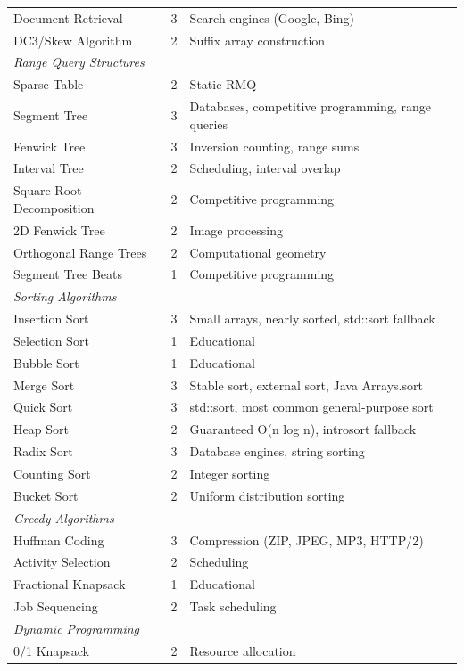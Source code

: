 \begin{center}
\begin{tabular}{lcl}
Document Retrieval & 3 & Search engines (Google, Bing) \\
DC3/Skew Algorithm & 2 & Suffix array construction \\
\midrule
\multicolumn{3}{l}{\textit{Range Query Structures}} \\
\midrule
Sparse Table & 2 & Static RMQ \\
Segment Tree & 3 & Databases, competitive programming, range queries \\
Fenwick Tree & 3 & Inversion counting, range sums \\
Interval Tree & 2 & Scheduling, interval overlap \\
Square Root Decomposition & 2 & Competitive programming \\
2D Fenwick Tree & 2 & Image processing \\
Orthogonal Range Trees & 2 & Computational geometry \\
Segment Tree Beats & 1 & Competitive programming \\
\midrule
\multicolumn{3}{l}{\textit{Sorting Algorithms}} \\
\midrule
Insertion Sort & 3 & Small arrays, nearly sorted, std::sort fallback \\
Selection Sort & 1 & Educational \\
Bubble Sort & 1 & Educational \\
Merge Sort & 3 & Stable sort, external sort, Java Arrays.sort \\
Quick Sort & 3 & std::sort, most common general-purpose sort \\
Heap Sort & 2 & Guaranteed O(n log n), introsort fallback \\
Radix Sort & 3 & Database engines, string sorting \\
Counting Sort & 2 & Integer sorting \\
Bucket Sort & 2 & Uniform distribution sorting \\
\midrule
\multicolumn{3}{l}{\textit{Greedy Algorithms}} \\
\midrule
Huffman Coding & 3 & Compression (ZIP, JPEG, MP3, HTTP/2) \\
Activity Selection & 2 & Scheduling \\
Fractional Knapsack & 1 & Educational \\
Job Sequencing & 2 & Task scheduling \\
\midrule
\multicolumn{3}{l}{\textit{Dynamic Programming}} \\
\midrule
0/1 Knapsack & 2 & Resource allocation \\

\end{tabular}
\end{center}
